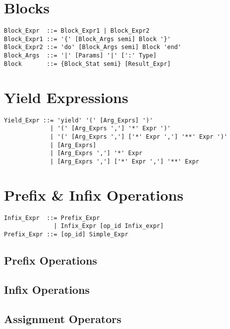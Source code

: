 \section{Blocks}

\syntax\begin{lstlisting}
Block_Expr  ::= Block_Expr1 | Block_Expr2
Block_Expr1 ::= '{' [Block_Args semi] Block '}'
Block_Expr2 ::= 'do' [Block_Args semi] Block 'end'
Block_Args  ::= '|' [Params] '|' [':' Type]
Block       ::= {Block_Stat semi} [Result_Expr]
\end{lstlisting}






\section{Yield Expressions}

\syntax\begin{lstlisting}
Yield_Expr ::= 'yield' '(' [Arg_Exprs] ')'
             | '(' [Arg_Exprs ','] '*' Expr ')'
             | '(' [Arg_Exprs ','] ['*' Expr ','] '**' Expr ')'
             | [Arg_Exprs]
             | [Arg_Exprs ','] '*' Expr
             | [Arg_Exprs ','] ['*' Expr ','] '**' Expr
\end{lstlisting}







\section{Prefix \& Infix Operations}
\label{sec:prefix-infix-ops}

\syntax\begin{lstlisting}
Infix_Expr  ::= Prefix_Expr
              | Infix_Expr [op_id Infix_expr]
Prefix_Expr ::= [op_id] Simple_Expr
\end{lstlisting}






\subsection{Prefix Operations}

\subsection{Infix Operations}

\subsection{Assignment Operators}


